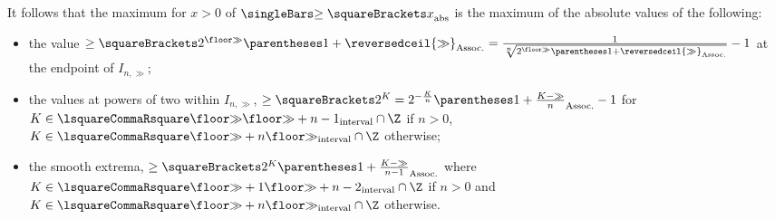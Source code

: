 \documentclass[10pt, a4paper, twoside]{basestyle}
\newcommand\ModOne[1]{\reversedceil{#1}}
\begin{document}
It follows that the maximum for $x>0$ of $\abs{\ge\of{x}}$ is the maximum of the absolute values of the
following:
\begin{itemize}
\item the value $\ge\of{2^{\Floor{\gg}}\pa{1+\ModOne{\gg}}}=
\frac{1}{\sqrt[n]{2^{\Floor{\gg}}\pa{1+\ModOne{\gg}}}}-1$ at the endpoint of $I_{n,\gg}$;
\item the values at powers of two within $I_{n,\gg}$,
$\ge\of{2^K}=2^{-\frac{K}{n}}\pa{1+\frac{K-\gg}{n}}-1$ for
$K\in \intclos{\Floor{\gg}}{\Floor{\gg}+n-1}\Intersection\Z$ if $n>0$,
$K\in \intclos{\Floor{\gg}+n}{\Floor{\gg}}\Intersection\Z$ otherwise;
\item the smooth extrema, $\ge\of{2^K\pa{1+\frac{K-\gg}{n-1}}}$ where
$K\in \intclos{\Floor{\gg}+1}{\Floor{\gg}+n-2}\Intersection\Z$ if $n>0$ and
$K\in \intclos{\Floor{\gg}+n}{\Floor{\gg}}\Intersection\Z$ otherwise.
\end{itemize}
\end{document}
